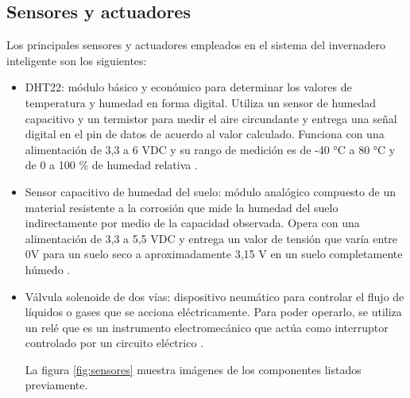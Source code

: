 %
\pagebreak

\subsection{Sensores y actuadores}
\label{sec:Sensores y actuadores}
Los principales sensores y actuadores empleados en el sistema del invernadero inteligente son los siguientes:
\begin{itemize}

\item DHT22: módulo básico y económico para determinar los valores de temperatura y humedad en forma digital. Utiliza un sensor de humedad capacitivo y un termistor para medir el aire circundante y entrega una señal digital en el pin de datos de acuerdo al valor calculado. Funciona con una alimentación de 3,3 a 6 VDC y su rango de medición es de -40 °C a 80 °C y de 0 a 100 \% de humedad relativa \citep{dht22}.

\item Sensor capacitivo de humedad del suelo: módulo analógico compuesto de un material resistente a la corrosión que mide la humedad del suelo indirectamente por medio de la capacidad observada. Opera con una alimentación de 3,3 a 5,5 VDC y entrega un valor de tensión que varía entre 0V para un suelo seco a aproximadamente 3,15 V en un suelo completamente húmedo \citep{soilsensor}.

\item Válvula solenoide de dos vías: dispositivo neumático para controlar el flujo de líquidos o gases que se acciona eléctricamente. Para poder operarlo, se utiliza un relé que es un instrumento electromecánico que actúa como interruptor controlado por un circuito eléctrico \citep{valve}\citep{rele}.

La figura \ref{fig:sensores} muestra imágenes de los componentes listados previamente.

\end{itemize}
%

